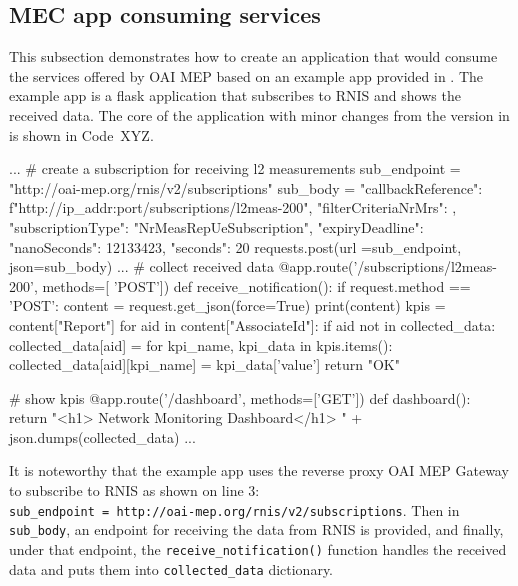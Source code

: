 \documentclass[12pt,a4paper,twoside]{report}
\begin{document}
\subsection{MEC app consuming services}
This subsection demonstrates how to create an application that would consume the services offered by OAI MEP based on an example app provided in \cite{oai-blueprint-git}. The example app is a flask application that subscribes to RNIS and shows the received data. The core of the application with minor changes from the version in \cite{oai-blueprint-git} is shown in Code~XYZ.
%
\begin{flask}[caption={example-app.py}]
	...
	# create a subscription for receiving l2 measurements
	sub_endpoint = "http://oai-mep.org/rnis/v2/subscriptions"
	sub_body ={
	"callbackReference": f"http://{ip_addr}:{port}/subscriptions/l2meas-200",
	"filterCriteriaNrMrs": {},
	"subscriptionType": "NrMeasRepUeSubscription",
	"expiryDeadline": {
		"nanoSeconds": 12133423,
		"seconds": 20
	}
	}
	requests.post(url =sub_endpoint, json=sub_body)
	...
	# collect received data
	@app.route('/subscriptions/l2meas-200', methods=[ 'POST'])
	def receive_notification():
		if request.method == 'POST':
			content = request.get_json(force=True)
			print(content)
			kpis = content["Report"]
			for aid in content["AssociateId"]:
				if aid not in collected_data:
					collected_data[aid] = {}
				for kpi_name, kpi_data in kpis.items():
					collected_data[aid][kpi_name] = kpi_data['value']
		return "OK"

	# show kpis
	@app.route('/dashboard', methods=['GET'])
	def dashboard():
		return "<h1> Network Monitoring Dashboard</h1> " + json.dumps(collected_data)
	...
\end{flask}
%
It is noteworthy that the example app uses the reverse proxy OAI MEP Gateway to subscribe to RNIS as shown on line 3:  \\\verb |sub_endpoint = http://oai-mep.org/rnis/v2/subscriptions|. Then in \verb|sub_body|, an endpoint for receiving the data from RNIS is provided, and finally, under that endpoint, the \verb|receive_notification()| function handles the received data and puts them into \verb|collected_data| dictionary.
%
\end{document}
